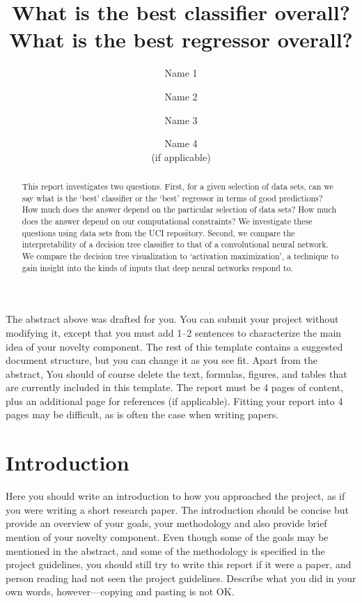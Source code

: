 \documentclass[10pt,twocolumn,letterpaper]{article}
\begin{document}
\title{What is the best classifier overall? 
       What is the best regressor overall?}
\author{Name 1 \and Name 2 \and Name 3 \and Name 4\\(if applicable)}
\maketitle

\begin{abstract}
   This report investigates two questions.
   First, for a given selection of data sets, can we say what
   is the `best' classifier or the `best' regressor in terms
   of good predictions?
   How much does the answer depend on the particular selection of data sets?
   How much does the answer depend on our computational constraints?
   We investigate these questions using data sets from the UCI repository.
   Second, we compare the interpretability of a decision tree
   classifier to that of a convolutional neural network.
   We compare the decision tree visualization
   to `activation maximization', a technique to gain insight into
   the kinds of inputs that deep neural networks respond to.
\end{abstract}

The abstract above was drafted for you.
You can submit your project without modifying it, except that you must
add 1--2 sentences to characterize the main idea of your novelty component.
The rest of this template contains a suggested document structure,
but you can change it as you see fit.
Apart from the abstract, You should of course delete the text, formulas, figures, and tables that are currently
included in this template.
The report must be 4 pages of content, plus an additional page for references (if applicable).
Fitting your report into 4 pages may be difficult, as is often the case when writing papers.

\section{Introduction}

Here you should write an introduction to how you approached the project,
as if you were writing a short research paper.
The introduction should be concise but provide an overview of your
goals, your methodology and also provide brief mention of your novelty component.
Even though some of the goals may be mentioned in the abstract,
and some of the methodology is specified in the project guidelines,
you should still try to write this report if it were a paper,
and person reading had not seen the project guidelines.
Describe what you did in your own words, however---copying and pasting is not OK.
\end{document}
